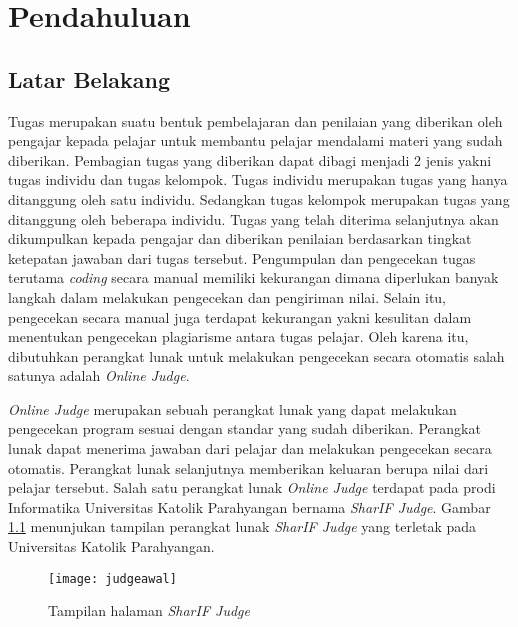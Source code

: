 \chapter{Pendahuluan}
\label{chap:intro}
   
\section{Latar Belakang}
\label{sec:label}

Tugas merupakan suatu bentuk pembelajaran dan penilaian yang diberikan oleh pengajar kepada pelajar untuk membantu pelajar mendalami materi yang sudah diberikan\cite{prihatini:16:plagiarisme}. Pembagian tugas yang diberikan dapat dibagi menjadi 2 jenis yakni tugas individu dan tugas kelompok. Tugas individu merupakan tugas yang hanya ditanggung oleh satu individu. Sedangkan tugas kelompok merupakan tugas yang ditanggung oleh beberapa individu. Tugas yang telah diterima selanjutnya akan dikumpulkan kepada pengajar dan diberikan penilaian berdasarkan tingkat ketepatan jawaban dari tugas tersebut. Pengumpulan dan pengecekan tugas terutama \textit{coding} secara manual memiliki kekurangan dimana diperlukan banyak langkah dalam melakukan pengecekan dan pengiriman nilai. Selain itu, pengecekan secara manual juga terdapat kekurangan yakni kesulitan dalam menentukan pengecekan plagiarisme antara tugas pelajar. Oleh karena itu, dibutuhkan perangkat lunak untuk melakukan pengecekan secara otomatis salah satunya adalah \textit{Online Judge}.

\textit{Online Judge} merupakan sebuah perangkat lunak yang dapat melakukan pengecekan program sesuai dengan standar yang sudah diberikan. Perangkat lunak dapat menerima jawaban dari pelajar dan melakukan pengecekan secara otomatis. Perangkat lunak selanjutnya memberikan keluaran berupa nilai dari pelajar tersebut\cite{kurnia:01:judge}. Salah satu perangkat lunak \textit{Online Judge} terdapat pada prodi Informatika Universitas Katolik Parahyangan bernama \textit{SharIF Judge}. Gambar \ref{fig:judgeawal} menunjukan tampilan perangkat lunak \textit{SharIF Judge} yang terletak pada Universitas Katolik Parahyangan.

\begin{figure}[H]
	\centering  
	\texttt{[image: judgeawal]}  
	\caption[Tampilan halaman \textit{SharIF Judge}]{Tampilan halaman \textit{SharIF Judge}} 
	\label{fig:judgeawal} 
\end{figure} 


